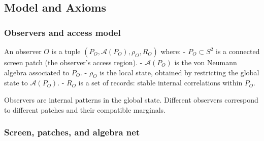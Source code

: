 \documentclass[11pt,a4paper]{article}
\theoremstyle{remark}
\begin{document}
\begin{abstract}
\textbf{Fundamental parameters.} The model reduces physics to two fundamental
parameters characterizing the holographic screen:

\begin{enumerate}
\def\labelenumi{\arabic{enumi}.}
\item
  \textbf{Pixel area}: \(a_{\rm cell} \approx 1.63\,\ell_P^2\), the geometric area
  of a single computational element. This sets the \emph{resolution} of reality
  (Newton's constant, gauge couplings, particle masses).
\item
  \textbf{Screen capacity}: \(\log(\dim\mathcal{H}_{\rm tot}) \sim 10^{122}\), the
  total degrees of freedom. This sets the \emph{size} of reality (cosmological
  constant, de Sitter horizon).
\end{enumerate}

Everything else (gauge groups, charge quantization, Einstein equations,
mass ratios) is derived structure. The axioms contain no other dimensionful
constants.
\end{abstract}



\subsection{Model and Axioms}\label{model-and-axioms}

\subsubsection{Observers and access model}\label{observers-and-access-model}

An observer \(O\) is a tuple \((P_O, \mathcal{A}(P_O), \rho_O, R_O)\) where:
- \(P_O \subset S^2\) is a connected screen patch (the observer's access region).
- \(\mathcal{A}(P_O)\) is the von Neumann algebra associated to \(P_O\).
- \(\rho_O\) is the local state, obtained by restricting the global state to \(\mathcal{A}(P_O)\).
- \(R_O\) is a set of records: stable internal correlations within \(P_O\).

Observers are internal patterns in the global state.
Different observers correspond to different patches and their compatible
marginals.

\subsubsection{Screen, patches, and algebra net}\label{screen-patches-and-algebra-net}
\end{document}
